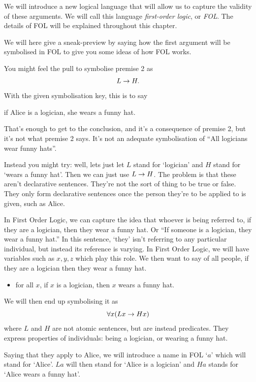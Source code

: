 We will introduce a new logical language that will allow us to capture the validity of these arguments. We will call this language \emph{first-order logic}, or \emph{FOL}. The details of FOL will be explained throughout this chapter.

We will here give a sneak-preview by saying how the first argument will be symbolised in FOL to give you some ideas of how FOL works.

You might feel the pull to symbolise premise 2 as $$L\rightarrow H.$$
With the given symbolisation key, this is to say \begin{samplesent}\item if Alice is a logician, she wears a funny hat.\end{samplesent} That's enough to get to the conclusion, and it's a consequence of premise 2, but it's not what premise 2 says. It's not an adequate symbolisation of ``All logicians wear funny hats''.

Instead you might try: well, lets just let $L$ stand for `logician' and $H$ stand for `wears a funny hat'. Then we can just use $L\rightarrow H$. The problem is that these aren't declarative sentences. They're not the sort of thing to be true or false. They only form declarative sentences once the person they're to be applied to is given, such as Alice. 

In First Order Logic, we can capture the idea that whoever is being referred to, if they are a logician, then they wear a funny hat. Or ``If someone is a logician, they wear a funny hat.'' 
In this sentence, `they' isn't referring to any particular individual, but instead its reference is varying. In First Order Logic, we will have variables such as $x,y,z$ which play this role.  
We then want to say of all people, if they are a logician then they wear a funny hat. 
\begin{itemize}
	\item for all $x$, if $x$ is a logician, then $x$ wears a funny hat.
\end{itemize} We will then end up symbolising it as $$\forall x(Lx\rightarrow Hx)$$ where $L$ and $H$ are not atomic sentences, but are instead predicates. They express properties of individuals: being a logician, or wearing a funny hat. 

Saying that they apply to Alice, we will introduce a name in FOL `$a$' which will stand for `Alice'. 
$La$ will then stand for `Alice is a logician' and $Ha$ stands for `Alice wears a funny hat'. 

